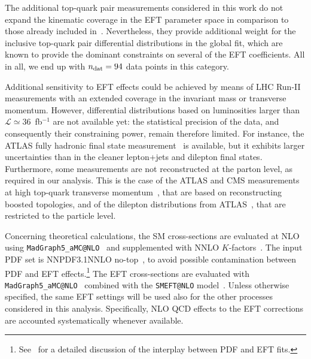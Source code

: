 The additional top-quark pair measurements considered
in this work do not expand the kinematic coverage
in the EFT parameter space in comparison to those already included
in~\cite{Hartland:2019bjb}.
%
Nevertheless, they provide additional weight for
the inclusive top-quark pair differential distributions in the global fit,
which are known to provide the dominant constraints on several of the EFT
coefficients.
%
All in all, we end up with $n_{\rm dat}=94$ data points in this category.

Additional sensitivity to EFT effects could be achieved
by means of LHC Run-II measurements with an extended coverage in the
invariant mass or transverse momentum.
%
However, differential distributions based on luminosities larger than
$\mathcal{L}\simeq 36$~fb$^{-1}$ are not available yet: the statistical
precision of the data, and consequently their constraining power, remain
therefore limited.
%
For instance, the ATLAS fully hadronic final state
measurement~\cite{Aad:2020nsf} is available, but it exhibits
larger uncertainties than in the cleaner lepton+jets and dilepton final states.
Furthermore, some measurements are not reconstructed at the parton level,
as required in our analysis.
%
This is the case of the ATLAS and CMS measurements
at high top-quark
transverse momentum~\cite{Aad:2020nsf,Sirunyan:2020vwa}, that are
based on reconstructing boosted topologies, and of the dilepton distributions
from ATLAS~\cite{Aad:2019hzw}, that are restricted to the particle level.

Concerning theoretical calculations, the SM cross-sections are evaluated at NLO
using {\tt MadGraph5\_aMC@NLO}~\cite{Alwall:2014hca} and supplemented with
NNLO $K$-factors~\cite{Czakon:2016dgf,Czakon:2016olj}.
The input PDF set is NNPDF3.1NNLO no-top~\cite{Ball:2017nwa},
to avoid possible contamination between PDF and EFT
effects.\footnote{See~\cite{Greljo:2021kvv,Carrazza:2019sec} for a detailed
  discussion of the interplay between PDF and EFT fits.}
%
The EFT cross-sections are evaluated with
{\tt MadGraph5\_aMC@NLO}~\cite{Alwall:2014hca}
combined with the {\tt SMEFT@NLO} model~\cite{Degrande:2020evl}.
Unless otherwise specified, the same EFT settings will be used also for the
other processes considered in this analysis.
%
Specifically, NLO QCD effects to
the EFT corrections are accounted systematically whenever available.

